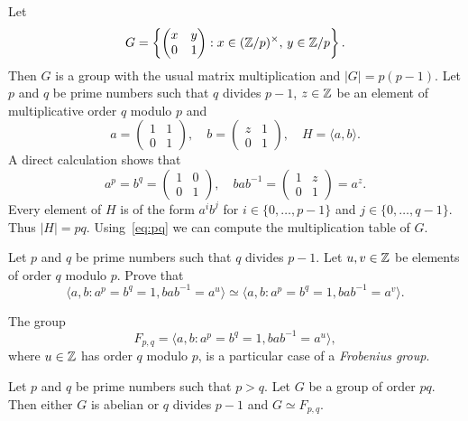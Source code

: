 Let 
\[
G=\left\{\begin{pmatrix}
x & y\\
0 & 1
\end{pmatrix}
:x\in(\mathbb{Z}/p)^\times,\,y\in\mathbb{Z}/p\right\}.
\]
Then $G$ is a group with the usual matrix multiplication
and $|G|=p(p-1)$. 
Let $p$ and $q$ be prime numbers such that $q$ divides $p-1$, 
$z\in\mathbb{Z}$ be an element of multiplicative order $q$ modulo $p$ 
and 
\[
a=\begin{pmatrix}
1&1\\
0&1
\end{pmatrix},
\quad
b=\begin{pmatrix}
z&1\\
0&1
\end{pmatrix},
\quad
H=\langle a,b\rangle.
\]
A direct calculation shows that 
\begin{equation}
\label{eq:pq}
a^p=b^q=\begin{pmatrix}
1&0\\
0&1
\end{pmatrix},
\quad
bab^{-1}=\begin{pmatrix}
1&z\\
0&1
\end{pmatrix}
=a^z.
\end{equation}
Every element of $H$ is of the form $a^ib^j$ for $i\in\{0,\dots,p-1\}$ and  $j\in\{0,\dots,q-1\}$. 
Thus $|H|=pq$. Using~\eqref{eq:pq} we can compute 
the multiplication table of $G$. 

\begin{exercise}
    Let $p$ and $q$ be prime numbers such that $q$ divides $p-1$. Let
    $u,v\in\mathbb{Z}$ be elements of order $q$ modulo $p$. 
    Prove that 
    \[
    \langle a,b:a^p=b^q=1,bab^{-1}=a^u\rangle
    \simeq \langle a,b:a^p=b^q=1,bab^{-1}=a^v\rangle.
    \]
\end{exercise}

The group   
\[
F_{p,q}=\langle a,b:a^p=b^q=1,bab^{-1}=a^u\rangle,
\]
where $u\in\mathbb{Z}$ has order $q$ modulo $p$, 
is a particular case of a  
\emph{Frobenius group}. 

\begin{proposition}
\label{pro:Frobenius_pq}
    Let $p$ and $q$ be prime numbers such that $p>q$. Let  
    $G$ be a group of order $pq$. Then either $G$ is abelian or
    $q$ divides $p-1$ and 
    $G\simeq F_{p,q}$.
\end{proposition}

